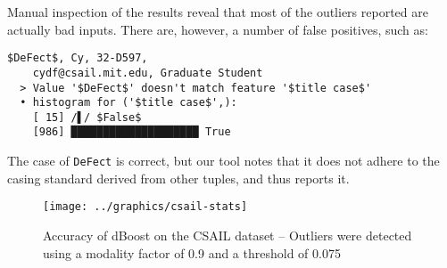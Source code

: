 Manual inspection of the results reveal that most of the outliers reported are actually bad inputs. There are, however, a number of false positives, such as:

\begin{lstlisting}[gobble=2]
  $DeFect$, Cy, 32-D597,
    cydf@csail.mit.edu, Graduate Student
  > Value '$DeFect$' doesn't match feature '$title case$'
  • histogram for ('$title case$',):
    [ 15] /▌/ $False$
    [986] ████████████████████ True
\end{lstlisting}

The case of \lstinline{DeFect} is correct, but our tool notes that it does not adhere to the casing standard derived from other tuples, and thus reports it.

\begin{figure*}
  \texttt{[image: ../graphics/csail-stats]}
  \caption{Accuracy of dBoost on the CSAIL dataset -- Outliers were detected using a modality factor of 0.9 and a threshold of 0.075}
  \label{fig:csail-evaluation}
\end{figure*}